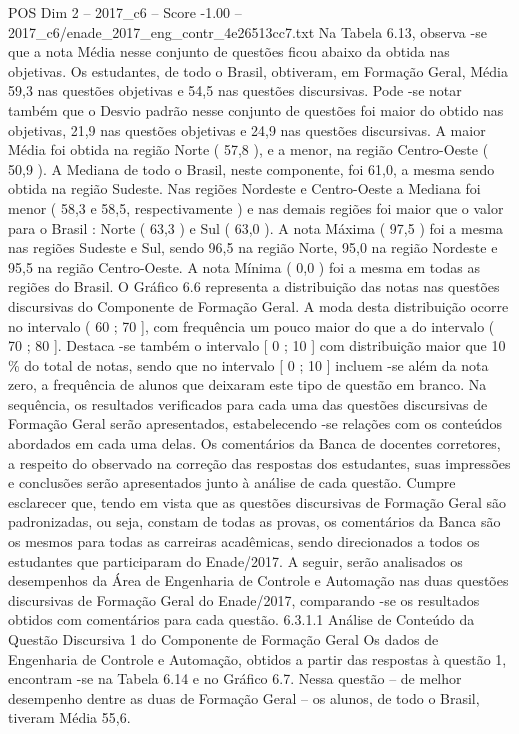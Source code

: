 \begin{textsample}{POS Dim 2 – 2017\_c6 – Score -1.00 – 2017\_c6/enade\_2017\_eng\_contr\_4e26513cc7.txt}
Na Tabela 6.13, observa -se que a nota Média nesse conjunto de questões ficou abaixo da obtida nas objetivas.
Os estudantes, de todo o Brasil, obtiveram, em Formação Geral, Média 59,3 nas questões objetivas e 54,5 nas questões discursivas.
Pode -se notar também que o Desvio padrão nesse conjunto de questões foi maior do obtido nas objetivas, 21,9 nas questões objetivas e 24,9 nas questões discursivas.
A maior Média foi obtida na região Norte ( 57,8 ), e a menor, na região Centro-Oeste ( 50,9 ).
A Mediana de todo o Brasil, neste componente, foi 61,0, a mesma sendo obtida na região Sudeste.
Nas regiões Nordeste e Centro-Oeste a Mediana foi menor ( 58,3 e 58,5, respectivamente ) e nas demais regiões foi maior que o valor para o Brasil : Norte ( 63,3 ) e Sul ( 63,0 ).
A nota Máxima ( 97,5 ) foi a mesma nas regiões Sudeste e Sul, sendo 96,5 na região Norte, 95,0 na região Nordeste e 95,5 na região Centro-Oeste.
A nota Mínima ( 0,0 ) foi a mesma em todas as regiões do Brasil.
O Gráfico 6.6 representa a distribuição das notas nas questões discursivas do Componente de Formação Geral.
A moda desta distribuição ocorre no intervalo ( 60 ; 70 ], com frequência um pouco maior do que a do intervalo ( 70 ; 80 ].
Destaca -se também o intervalo [ 0 ; 10 ] com distribuição maior que 10 \% do total de notas, sendo que no intervalo [ 0 ; 10 ] incluem -se além da nota zero, a frequência de alunos que deixaram este tipo de questão em branco.
Na sequência, os resultados verificados para cada uma das questões discursivas de Formação Geral serão apresentados, estabelecendo -se relações com os conteúdos abordados em cada uma delas.
Os comentários da Banca de docentes corretores, a respeito do observado na correção das respostas dos estudantes, suas impressões e conclusões serão apresentados junto à análise de cada questão.
Cumpre esclarecer que, tendo em vista que as questões discursivas de Formação Geral são padronizadas, ou seja, constam de todas as provas, os comentários da Banca são os mesmos para todas as carreiras acadêmicas, sendo direcionados a todos os estudantes que participaram do Enade/2017.
A seguir, serão analisados os desempenhos da Área de Engenharia de Controle e Automação nas duas questões discursivas de Formação Geral do Enade/2017, comparando -se os resultados obtidos com comentários para cada questão. 6.3.1.1 Análise de Conteúdo da Questão Discursiva 1 do Componente de Formação Geral Os dados de Engenharia de Controle e Automação, obtidos a partir das respostas à questão 1, encontram -se na Tabela 6.14 e no Gráfico 6.7.
Nessa questão – de melhor desempenho dentre as duas de Formação Geral – os alunos, de todo o Brasil, tiveram Média 55,6.

\end{textsample}
